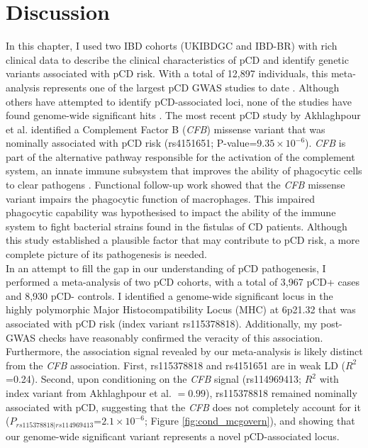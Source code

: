 \section{Discussion}
In this chapter, I used two IBD cohorts (UKIBDGC and IBD-BR) with rich clinical data to describe the clinical characteristics of pCD and identify genetic variants associated with pCD risk. With a total of 12,897 individuals, this meta-analysis represents one of the largest pCD GWAS studies to date \cite{Akhlaghpour2023-jw}. Although others have attempted to identify pCD-associated loci, none of the studies have found genome-wide significant hits \cite{Akhlaghpour2023-jw,Kaur2016-ut}. The most recent pCD study by Akhlaghpour et al. identified a Complement Factor B (\textit{CFB}) missense variant that was nominally associated with pCD risk (rs4151651; P-value=$9.35\times10^{-6}$). \textit{CFB} is part of the alternative pathway responsible for the activation of the complement system, an innate immune subsystem that improves the ability of phagocytic cells to clear pathogens \cite{Huang2002-of,Goring2009-cs}. Functional follow-up work showed that the \textit{CFB} missense variant impairs the phagocytic function of macrophages. This impaired phagocytic capability was hypothesised to impact the ability of the immune system to fight bacterial strains found in the fistulas of CD patients. Although this study established a plausible factor that may contribute to pCD risk, a more complete picture of its pathogenesis is needed.\\


In an attempt to fill the gap in our understanding of pCD pathogenesis, I performed a meta-analysis of two pCD cohorts, with a total of 3,967 pCD+ cases and 8,930 pCD- controls. I identified a genome-wide significant locus in the highly polymorphic Major Histocompatibility Locus (MHC) at 6p21.32 that was associated with pCD risk (index variant rs115378818). Additionally, my post-GWAS checks have reasonably confirmed the veracity of this association. Furthermore, the association signal revealed by our meta-analysis is likely distinct from the \textit{CFB} association. First, rs115378818 and rs4151651 are in weak LD ($R^{2}$=0.24). Second, upon conditioning on the \textit{CFB} signal (rs114969413; $R^{2}$ with index variant from Akhlaghpour et al. $=0.99$), rs115378818 remained nominally associated with pCD, suggesting that the \textit{CFB} does not completely account for it ($P_{rs115378818|rs114969413}$=$2.1\times10^{-6}$; Figure \ref{fig:cond_mcgovern}), and showing that our genome-wide significant variant represents a novel pCD-associated locus. \\

